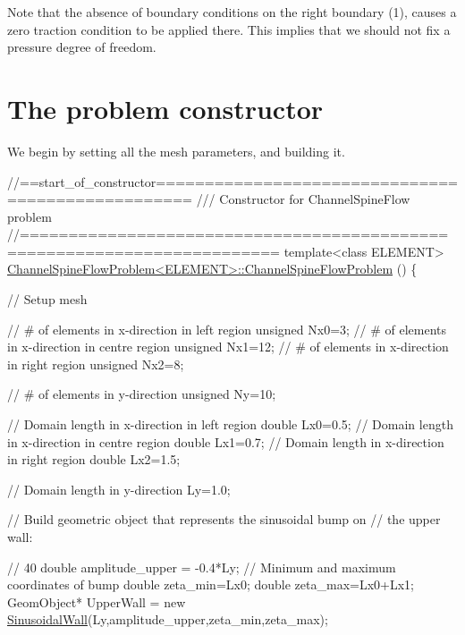 Note that the absence of boundary conditions on the right boundary (1), causes a zero traction condition to be applied there. This implies that we should not fix a pressure degree of freedom.



 

\hypertarget{index_constructor}{}\section{The problem constructor}\label{index_constructor}
We begin by setting all the mesh parameters, and building it.


\begin{DoxyCodeInclude}
\textcolor{comment}{//==start\_of\_constructor==================================================}
\textcolor{comment}{/// Constructor for ChannelSpineFlow problem }
\textcolor{comment}{}\textcolor{comment}{//========================================================================}
\textcolor{keyword}{template}<\textcolor{keyword}{class} ELEMENT>
\hyperlink{classChannelSpineFlowProblem_a23f1b987e3395b1d101eaf3f3b5c94b2}{ChannelSpineFlowProblem<ELEMENT>::ChannelSpineFlowProblem}
      ()
\{ 

 \textcolor{comment}{// Setup mesh}

 \textcolor{comment}{// # of elements in x-direction in left region }
 \textcolor{keywordtype}{unsigned} Nx0=3;
 \textcolor{comment}{// # of elements in x-direction in centre region}
 \textcolor{keywordtype}{unsigned} Nx1=12;
 \textcolor{comment}{// # of elements in x-direction in right region}
 \textcolor{keywordtype}{unsigned} Nx2=8;

 \textcolor{comment}{// # of elements in y-direction}
 \textcolor{keywordtype}{unsigned} Ny=10;

 \textcolor{comment}{// Domain length in x-direction in left region}
 \textcolor{keywordtype}{double} Lx0=0.5;
 \textcolor{comment}{// Domain length in x-direction in centre region}
 \textcolor{keywordtype}{double} Lx1=0.7;
 \textcolor{comment}{// Domain length in x-direction in right region}
 \textcolor{keywordtype}{double} Lx2=1.5;
 
 \textcolor{comment}{// Domain length in y-direction}
 Ly=1.0;
 
 \textcolor{comment}{// Build geometric object that represents the sinusoidal bump on}
 \textcolor{comment}{// the upper wall:}

 \textcolor{comment}{// 40%
 \textcolor{keywordtype}{double} amplitude\_upper = -0.4*Ly;
 \textcolor{comment}{// Minimum and maximum coordinates of bump}
 \textcolor{keywordtype}{double} zeta\_min=Lx0;
 \textcolor{keywordtype}{double} zeta\_max=Lx0+Lx1;
 GeomObject* UpperWall = 
  \textcolor{keyword}{new} \hyperlink{classSinusoidalWall}{SinusoidalWall}(Ly,amplitude\_upper,zeta\_min,zeta\_max);
 
}
\end{DoxyCodeInclude}
